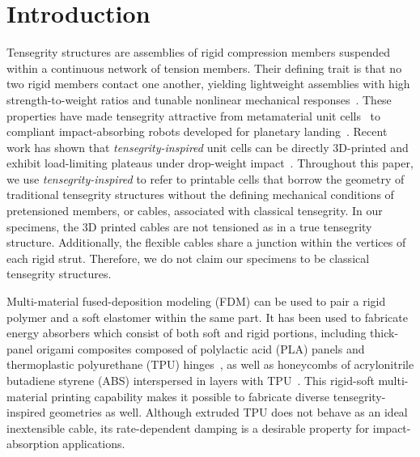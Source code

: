 \documentclass[lineno,nocopyright,upint,varvw,hyphenate]{asmejour}
\begin{document}
\section{Introduction}
\label{sec:introduction}

Tensegrity structures are assemblies of rigid compression members
suspended within a continuous network of tension members. Their defining
trait is that no two rigid members contact one another, yielding lightweight assemblies with
high strength-to-weight ratios and tunable nonlinear mechanical
responses~\citep{skelton2009tensegrity, sultan2009tensegrity}. These
properties have made tensegrity attractive from
metamaterial unit cells~\citep{amendola2014experimental,
zhang2018tensegrity, fraternali2015tensegrity} to compliant impact-absorbing
robots developed for planetary landing~\citep{agogino2018superball,
caluwaerts2014superball, sabelhaus2015system, vespignani2018design,
deitrich2022titan}. Recent work has shown that \emph{tensegrity-inspired}
unit cells can be directly 3D-printed and exhibit load-limiting plateaus
under drop-weight impact~\citep{pajunen2019design}. Throughout this paper,
we use \emph{tensegrity-inspired} to refer to printable cells that borrow
the geometry of traditional tensegrity structures without the defining
mechanical conditions of pretensioned members, or cables, associated
with classical tensegrity. In our specimens, the 3D printed cables are
not tensioned as in a true tensegrity structure. Additionally, the
flexible cables share a junction within the vertices of each rigid
strut. Therefore, we do not claim our specimens to be classical
tensegrity structures.

Multi-material fused-deposition modeling (FDM) can be used to pair a
rigid polymer and a soft elastomer within the same part. It has been
used to fabricate energy absorbers which consist of both soft and rigid
portions, including thick-panel origami composites composed of
polylactic acid (PLA) panels and thermoplastic polyurethane (TPU)
hinges~\citep{ye2023multimaterial}, as well as honeycombs of
acrylonitrile butadiene styrene (ABS) interspersed in layers with
TPU~\citep{khatri2024energy}. This rigid-soft multi-material printing
capability makes it possible to fabricate diverse tensegrity-inspired
geometries as well. Although extruded TPU does not behave as an ideal
inextensible cable, its rate-dependent damping is a desirable property
for impact-absorption applications.
\end{document}
